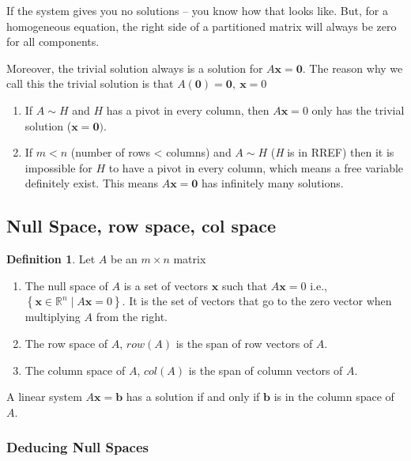 \documentclass[12pt]{article}
\theoremstyle{plain}
\theoremstyle{remark}
\theoremstyle{definition}
\newtheorem{definition}{Definition}[section]
\begin{document}
If the system gives you no solutions -- you know how that looks like.
But, for a homogeneous equation, the right side of a partitioned matrix
will always be zero for all components.

Moreover, the trivial solution always is a solution for
\(A\mathbf{x} = \mathbf{0}\). The reason why we call this the
trivial solution is that
\(A\left( \mathbf{0} \right) = \mathbf{0},\ \mathbf{x} = 0\)

\begin{enumerate}
\def\labelenumi{\arabic{enumi}.}
\setcounter{enumi}{1}
\item
  If \(A\sim H\) and \(H\) has a pivot in every column, then
  \(A\mathbf{x} = 0\) only has the trivial solution
  (\(\mathbf{x} = \mathbf{0})\).
\item
  If \(m < n\) (number of rows \textless{} columns) and \(A\sim H\)
  (\emph{H} is in RREF) then it is impossible for \(H\) to have a pivot
  in every column, which means a free variable definitely exist. This
  means \(A\mathbf{x} = \mathbf{0}\) has infinitely many
  solutions.
\end{enumerate}


\subsection{Null Space, row space, col
space}

\begin{definition}
Let \(A\) be an \(m \times n\) matrix

\begin{enumerate}
\def\labelenumi{\arabic{enumi}.}
\item
  The null space of \(A\) is a set of vectors \(\mathbf{x}\) such
  that \(A\mathbf{x} = 0\) i.e.,
  \(\left\{ \mathbf{x} \in \mathbb{R}^{n}\mid A\mathbf{x} = 0 \right\}\).
  It is the set of vectors that go to the zero vector when multiplying
  \(A\) from the right.
\item
  The row space of \(A\), \(row(A)\) is the span of row vectors of
  \(A\).
\item
  The column space of \(A\), \(col(A)\) is the span of column vectors of
  \(A\).
\end{enumerate}
\end{definition}

A linear system \(A\mathbf{x} = \mathbf{b}\) has a solution if
and only if \(\mathbf{b}\) is in the column space of \(A\).


\subsubsection{Deducing Null Spaces}
\end{document}
